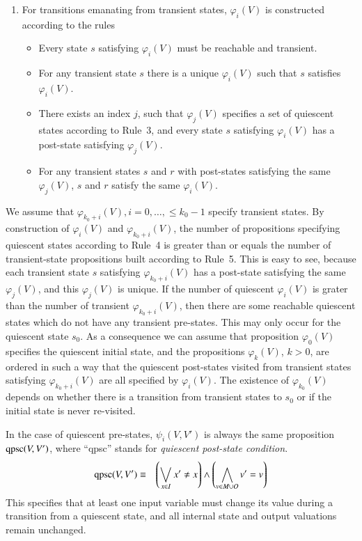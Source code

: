 \begin{enumerate}
\item For transitions emanating from transient states, $\varphi_i(V)$ is constructed according to the rules
\begin{itemize}
\item Every state $s$ satisfying $\varphi_i(V)$ must be reachable and transient.

\item For any transient state $s$ there is a unique $\varphi_i(V)$ such that $s$ satisfies $\varphi_i(V)$.

\item There exists an index $j$, such that $\varphi_j(V)$ specifies a set of quiescent states
according to Rule~3, and every state $s$ satisfying $\varphi_i(V)$ has a post-state satisfying 
$\varphi_j(V)$.

\item For any transient states $s$ and $r$ with post-states  satisfying the same $\varphi_j(V)$, $s$ and $r$ satisfy the same $\varphi_i(V)$. 
\end{itemize}
\end{enumerate}

We assume that 
$\varphi_{k_0+i}(V), i = 0,\dots, \le k_0-1$ specify transient states. By construction of $\varphi_i(V)$ and $\varphi_{k_0+i}(V)$, the number of propositions specifying quiescent states according to Rule~4 is greater than or  equals the number of transient-state propositions built according to Rule~5. This is easy to see, because each transient state $s$ satisfying $\varphi_{k_0+i}(V)$ has a post-state satisfying the same $\varphi_j(V)$, and this $\varphi_j(V)$ is unique. If the number of quiescent $\varphi_i(V)$ is grater than the number of transient $\varphi_{k_0+i}(V)$, then there are some reachable quiescent states which do not have any transient pre-states. This may only occur for the quiescent state $s_0$. As a consequence we can assume that  proposition $\varphi_0(V)$ specifies the quiescent initial  state, and the propositions $\varphi_k(V)$, $k> 0$, are ordered in such a way that the quiescent post-states visited from transient states satisfying $\varphi_{k_0+i}(V)$ are all specified by $\varphi_i(V)$.  The existence of $\varphi_{k_0}(V)$ depends on whether there is a transition from transient states to $s_0$ or if the initial state is never re-visited.

In the case of quiescent pre-states, $\psi_i(V,V')$ is always the same proposition $\text{qpsc}(V,V')$,
where ``qpsc'' stands for {\it quiescent post-state condition}.
\begin{eqnarray*}
\text{qpsc}(V,V') & \equiv  & \left(\bigvee_{x\in I}x' \neq x\right) \wedge
 \left(\bigwedge_{v\in M\cup O} v' = v\right)
\end{eqnarray*}
This specifies that at least one input variable must change its value during a transition from a quiescent state, and all internal state and output valuations remain unchanged.

